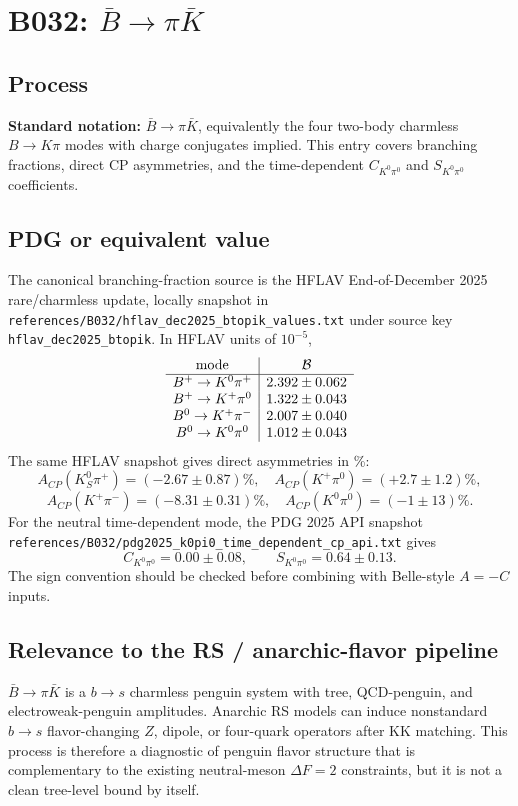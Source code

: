 
\section{B032: \(\bar B\to \pi\bar K\)}

\subsection*{Process}
\textbf{Standard notation:} \(\bar B\to \pi\bar K\), equivalently the four
two-body charmless \(B\to K\pi\) modes with charge conjugates implied.  This
entry covers branching fractions, direct CP asymmetries, and the
time-dependent \(C_{K^0\pi^0}\) and \(S_{K^0\pi^0}\) coefficients.

\subsection*{PDG or equivalent value}
The canonical branching-fraction source is the HFLAV End-of-December 2025
rare/charmless update, locally snapshot in
\texttt{references/B032/hflav\_dec2025\_btopik\_values.txt} under source key
\texttt{hflav\_dec2025\_btopik}.  In HFLAV units of \(10^{-5}\),
\[
\begin{array}{c|c}
{\rm mode} & {\cal B} \\
\hline
B^+\to K^0\pi^+ & 2.392\pm0.062 \\
B^+\to K^+\pi^0 & 1.322\pm0.043 \\
B^0\to K^+\pi^- & 2.007\pm0.040 \\
B^0\to K^0\pi^0 & 1.012\pm0.043
\end{array}
\]
The same HFLAV snapshot gives direct asymmetries in \%:
\[
A_{CP}(K^0_S\pi^+)=(-2.67\pm0.87)\%,\quad
A_{CP}(K^+\pi^0)=(+2.7\pm1.2)\%,
\]
\[
A_{CP}(K^+\pi^-)=(-8.31\pm0.31)\%,\quad
A_{CP}(K^0\pi^0)=(-1\pm13)\% .
\]
For the neutral time-dependent mode, the PDG 2025 API snapshot
\texttt{references/B032/pdg2025\_k0pi0\_time\_dependent\_cp\_api.txt} gives
\[
  C_{K^0\pi^0}=0.00\pm0.08,\qquad S_{K^0\pi^0}=0.64\pm0.13 .
\]
The sign convention should be checked before combining with Belle-style
\(A=-C\) inputs.

\subsection*{Relevance to the RS / anarchic-flavor pipeline}
\(\bar B\to\pi\bar K\) is a \(b\to s\) charmless penguin system with tree,
QCD-penguin, and electroweak-penguin amplitudes.  Anarchic RS models can
induce nonstandard \(b\to s\) flavor-changing \(Z\), dipole, or four-quark
operators after KK matching.  This process is therefore a diagnostic of
penguin flavor structure that is complementary to the existing neutral-meson
\(\Delta F=2\) constraints, but it is not a clean tree-level bound by itself.

